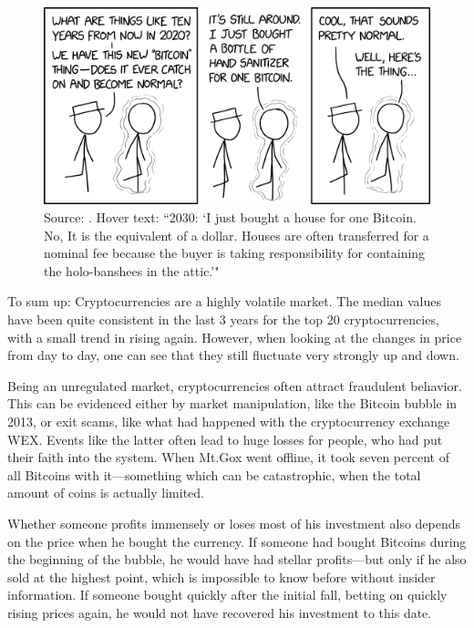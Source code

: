 \documentclass[11pt,a4paper,compsoc,conference]{IEEEtran}
\begin{document}
\begin{figure}[ht]
  \centering
  \includegraphics[width=\linewidth]{figures/2010_and_2020.png}
  \caption[xkcd comic]{Source: \cite{xkcd}. Hover text: ``2030: `I just bought a house for one Bitcoin. No, It is the equivalent of a dollar. Houses are often transferred for a nominal fee because the buyer is taking responsibility for containing the holo-banshees in the attic.'"}
  \label{xkcd}
\end{figure} 

To sum up: Cryptocurrencies are a highly volatile market. The median values have been quite consistent in the last 3 years for the top 20 cryptocurrencies, with a small trend in rising again. However, when looking at the changes in price from day to day, one can see that they still fluctuate very strongly up and down. 

Being an unregulated market, cryptocurrencies often attract fraudulent behavior. This can be evidenced either by market manipulation, like the Bitcoin bubble in 2013, or exit scams, like what had happened with the cryptocurrency exchange WEX. Events like the latter often lead to huge losses for people, who had put their faith into the system. When Mt.Gox went offline, it took seven percent of all Bitcoins with it---something which can be catastrophic, when the total amount of coins is actually limited.

Whether someone profits immensely or loses most of his investment also depends on the price when he bought the currency. If someone had bought Bitcoins during the beginning of the bubble, he would have had stellar profits---but only if he also sold at the highest point, which is impossible to know before without insider information. If someone bought quickly after the initial fall, betting on quickly rising prices again, he would not have recovered his investment to this date.  
\end{document}
